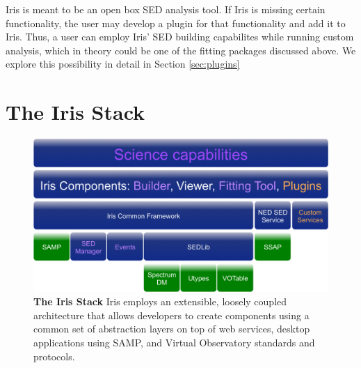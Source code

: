 \documentclass[preprint,12pt,3p]{elsarticle}
\begin{document}
Iris is meant to be an open box SED analysis tool. If Iris is missing certain functionality, the user may develop a plugin for that functionality and add it to Iris. Thus, a user can employ Iris' SED building capabilites while running custom analysis, which in theory could be one of the fitting packages discussed above. We explore this possibility in detail in Section \ref{sec:plugins}



%

\section{The Iris Stack}
\label{sec:stack}

\begin{figure}[h!]
\begin{center}
\includegraphics[width=0.7\columnwidth]{figures/IrisStack/IrisStack.png}
\caption{\textbf{\label{fig:stack} The Iris Stack} Iris employs an extensible, loosely coupled architecture that allows developers to create components using a common set of abstraction layers on top of web services, desktop applications using SAMP, and Virtual Observatory standards and protocols.}
\end{center}
\end{figure}
\end{document}
